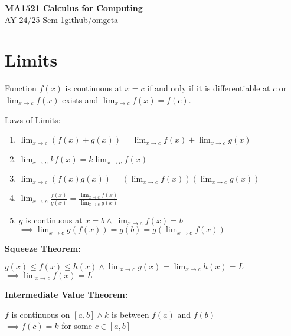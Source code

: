 \documentclass[12pt, a4paper]{article}
\newcommand{\mytitle}{MA1521 Calculus for Computing}
\newcommand{\myauthor}{github/omgeta}
\newcommand{\mydate}{AY 24/25 Sem 1}
\begin{document}
\raggedright
\footnotesize
\begin{multicols*}{3}
\setlength{\premulticols}{1pt}
\setlength{\postmulticols}{1pt}
\setlength{\multicolsep}{1pt}
\setlength{\columnsep}{2pt}

{\normalsize{\textbf{\mytitle}}} \\
{\footnotesize{\mydate\hspace{2pt}\textemdash\hspace{2pt}\myauthor}}
\section{Limits}
Function $f(x)$ is continuous at $x=c$ if and only if it is differentiable at $c$ or $\displaystyle \lim_{x\rightarrow c}f(x)$ exists and $\displaystyle \lim_{x\rightarrow c}f(x) = f(c)$.

Laws of Limits:
\begin{enumerate}[\roman*.]
  \item $\displaystyle \lim_{x\rightarrow c}(f(x) \pm g(x)) = \lim_{x\rightarrow c}f(x) \pm \lim_{x\rightarrow c}g(x)$
  \item $\displaystyle \lim_{x\rightarrow c}kf(x) = k\lim_{x\rightarrow c}f(x)$
  \item $\displaystyle \lim_{x\rightarrow c}(f(x)g(x)) = (\lim_{x\rightarrow c}f(x))(\lim_{x\rightarrow c}g(x))$
  \item $\displaystyle \lim_{x\rightarrow c} \frac{f(x)}{g(x)} = \frac{\lim_{x\rightarrow c}f(x)}{\lim_{x\rightarrow c}g(x)}$
  \item $g$ is continuous at $x=b \land \displaystyle\lim_{x\rightarrow c}f(x)=b $\\$\implies \lim_{x\rightarrow c}g(f(x)) = g(b) = g(\lim_{x\rightarrow c}f(x))$
\end{enumerate}
\textbf{Squeeze Theorem:}\\
{\centering
  $g(x) \leq f(x) \leq h(x) \land \displaystyle \lim_{x\rightarrow c}g(x) = \lim_{x\rightarrow c}h(x) = L $\\$\implies \displaystyle \lim_{x\rightarrow c}f(x) = L$
\par}

\textbf{Intermediate Value Theorem:}\\
{\centering
  $f$ is continuous on $[a,b] \land k$ is between $f(a)$ and $f(b)$\\
  $\implies f(c) = k$ for some $c \in [a,b]$
\par}


\end{multicols*}
\end{document}
